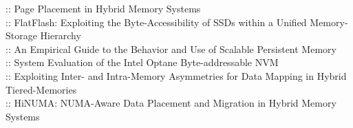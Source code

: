 \cite{hybridmem.ics11} :: Page Placement in Hybrid Memory Systems \\
\cite{flatflash.asplos19} :: FlatFlash: Exploiting the Byte-Accessibility of SSDs within a Unified Memory-Storage Hierarchy \\
\cite{scalepm.fast20} :: An Empirical Guide to the Behavior and Use of Scalable Persistent Memory \\
\cite{optaneeval.memsys19} :: System Evaluation of the Intel Optane Byte-addressable NVM \\
\cite{hybridtiering.ismm20} :: Exploiting Inter- and Intra-Memory Asymmetries for Data Mapping in Hybrid Tiered-Memories \\
\cite{hinuma.iccd19} :: HiNUMA: NUMA-Aware Data Placement and Migration in Hybrid Memory Systems \\

